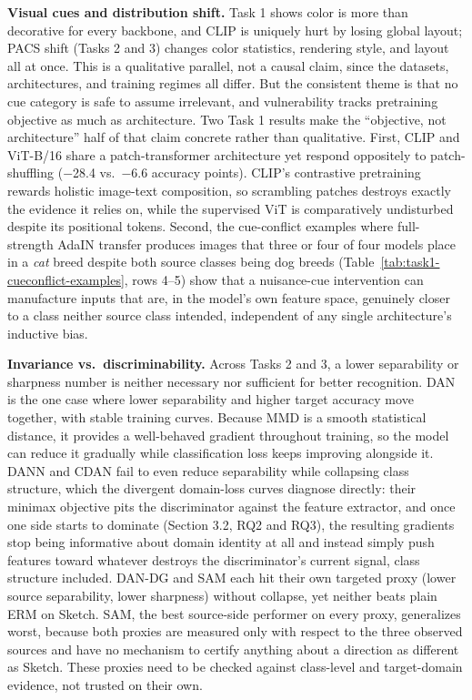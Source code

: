 \documentclass{article}
\begin{document}
\textbf{Visual cues and distribution shift.} Task 1 shows color is more than decorative for every
backbone, and CLIP is uniquely hurt by losing global layout; PACS shift (Tasks 2 and 3) changes
color statistics, rendering style, and layout all at once. This is a qualitative parallel, not a
causal claim, since the datasets, architectures, and training regimes all differ. But the
consistent theme is that no cue category is safe to assume irrelevant, and vulnerability tracks
pretraining objective as much as architecture. Two Task 1 results make the ``objective, not
architecture'' half of that claim concrete rather than qualitative. First, CLIP and ViT-B/16 share
a patch-transformer architecture yet respond oppositely to patch-shuffling ($-$28.4 vs.\ $-$6.6
accuracy points). CLIP's contrastive pretraining rewards holistic image-text composition, so
scrambling patches destroys exactly the evidence it relies on, while the supervised ViT is
comparatively undisturbed despite its positional tokens. Second, the cue-conflict examples where
full-strength AdaIN transfer produces images that three or four of four models place in a
\emph{cat} breed despite both source classes being dog breeds
(Table~\ref{tab:task1-cueconflict-examples}, rows 4--5) show that a nuisance-cue intervention can
manufacture inputs that are, in the model's own feature space, genuinely closer to a class neither
source class intended, independent of any single architecture's inductive bias.

\textbf{Invariance vs.\ discriminability.} Across Tasks 2 and 3, a lower separability or sharpness
number is neither necessary nor sufficient for better recognition. DAN is the one case where lower
separability and higher target accuracy move together, with stable training curves. Because MMD is
a smooth statistical distance, it provides a well-behaved gradient throughout training, so the
model can reduce it gradually while classification loss keeps improving alongside it. DANN and CDAN
fail to even reduce separability while collapsing class structure, which the divergent domain-loss
curves diagnose directly: their minimax objective pits the discriminator against the feature
extractor, and once one side starts to dominate (Section 3.2, RQ2 and RQ3), the resulting gradients
stop being informative about domain identity at all and instead simply push features toward whatever
destroys the discriminator's current signal, class structure included. DAN-DG and SAM each hit
their own targeted proxy (lower source separability, lower sharpness) without collapse, yet neither
beats plain ERM on Sketch. SAM, the best source-side performer on every proxy, generalizes worst,
because both proxies are measured only with respect to the three observed sources and have no
mechanism to certify anything about a direction as different as Sketch. These proxies need to be
checked against class-level and target-domain evidence, not trusted on their own.
\end{document}
